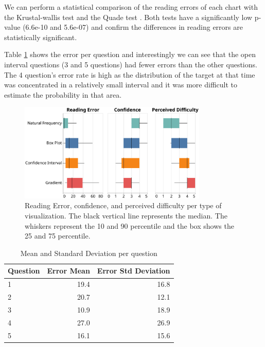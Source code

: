 \documentclass[a4paper,3p,sort&compress]{elsarticle}
\begin{document}
We can perform a statistical comparison of the reading errors of each chart with the Krustal-wallis test \cite{krustal} and 
the Quade test \cite{quade_rank_1967}. Both tests have a 
significantly low p-value (6.6e-10 and 5.6e-07) and confirm the differences in reading errors are statistically significant.

Table \ref{table:resultsperquestion} shows the error per question and interestingly we can see that the open interval questions (3 and 5 questions) 
had fewer errors than the other questions. The 4 question's error rate is high as the distribution of the target 
at that time was concentrated in a relatively 
small interval and it was more difficult to estimate the probability in that area. 

\begin{figure}
  \centering
  \includegraphics[width=0.8\textwidth]{comparison}
  \caption{\label{figure:errors}Reading Error, confidence, and perceived difficulty per 
  type of visualization. The black vertical line represents the median.
  The whiskers represent the 10 and 90 percentile and the box shows the 25 and 
  75 percentile.}
\end{figure}


\begin{table}[h!]
  \centering
  \begin{tabular}{lrr}
    \toprule
    {}Question &     Error Mean &        Error Std Deviation \\
    \midrule
    1 &  19.4 &  16.8 \\
    2 &  20.7 &  12.1 \\
    3 &  10.9 &  18.9 \\
    4 &  27.0 &  26.9 \\
    5 &  16.1 &  15.6 \\
    \bottomrule
    \end{tabular}
  \caption{Mean and Standard Deviation per question}
  \label{table:resultsperquestion}
  \end{table}
\end{document}
